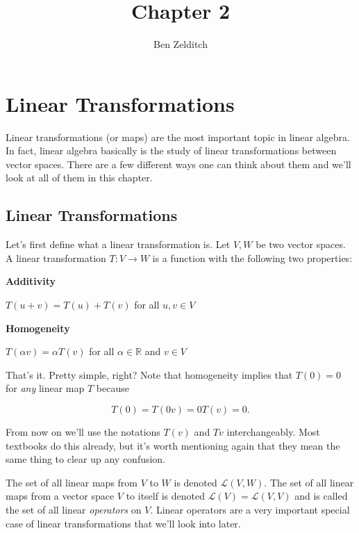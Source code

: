 \documentclass[12pt]{article}
\title{Chapter 2}
\author{Ben Zelditch}
\begin{document}
\maketitle

\section*{Linear Transformations}

Linear transformations (or maps) are the most important topic in linear algebra. In fact, linear algebra basically is the study of linear transformations between vector spaces. There are a few different ways one can think about them and we'll look at all of them in this chapter. 

\subsection*{Linear Transformations}

Let's first define what a linear transformation is. Let $V, W$ be two vector spaces. A linear transformation $T : V \rightarrow W$ is a function with the following two properties:

\vskip 3mm

\textbf{Additivity}

$T(u + v) = T(u) + T(v)$ for all $u, v \in V$

\vskip 2mm

\textbf{Homogeneity}

$T(\alpha v) = \alpha T(v)$ for all $\alpha \in \mathbb{R}$ and $v \in V$

\vskip 5mm

That's it. Pretty simple, right? Note that homogeneity implies that $T(0) = 0$ for \textit{any} linear map $T$ because

$$T(0) = T(0v) = 0T(v) = 0.$$

From now on we'll use the notations $T(v)$ and $Tv$ interchangeably. Most textbooks do this already, but it's worth mentioning again that they mean the same thing to clear up any confusion.

\vskip 2mm

The set of all linear maps from $V$ to $W$ is denoted $\mathcal{L}(V, W)$. The set of all linear maps from a vector space $V$ to itself is denoted $\mathcal{L}(V) = \mathcal{L}(V, V)$ and is called the set of all linear \textit{operators} on $V$. Linear operators are a very important special case of linear transformations that we'll look into later.
\end{document}
